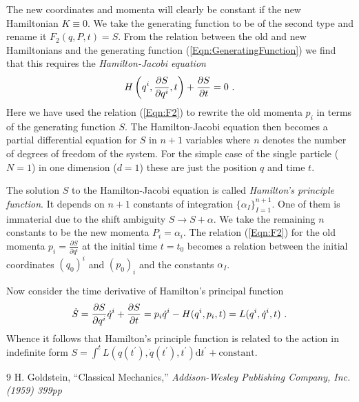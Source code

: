 \documentclass[12pt]{article}
\begin{document}
The new coordinates and momenta will clearly be constant if the new Hamiltonian $K\equiv 0$. We take the generating function to be of the second type and rename it $F_2(q,P,t)=S$. From the relation between the old and new Hamiltonians and the generating function (\ref{Eqn:GeneratingFunction}) we find that this requires the {\em Hamilton-Jacobi equation}
\begin{eqnarray}
H\left(q^i, {\partial S\over \partial q^i}, t\right)+{\partial S\over \partial t}=0~.
\end{eqnarray}
Here we have used the relation (\ref{Eqn:F2}) to rewrite the old momenta $p_i$ in terms of the generating function $S$. The Hamilton-Jacobi equation then becomes a partial differential equation for $S$ in $n+1$ variables where $n$ denotes the number of degrees of freedom of the system. For the simple case of the single particle ($N=1$) in one dimension ($d=1$) these are just the position $q$ and time $t$. 

The solution $S$ to the Hamilton-Jacobi equation is called {\em Hamilton's principle function}. It depends on $n+1$ constants of integration $\{\alpha_I\}_{I=1}^{n+1}$. One of them is immaterial due to the shift ambiguity $S\to S+\alpha$. We take the remaining $n$ constants to be the new momenta $P_i=\alpha_i$. The relation (\ref{Eqn:F2}) for the old momenta $p_i=\frac{\partial S}{\partial q^i}$ at the initial time $t=t_0$ becomes a relation between the initial coordinates%
$(q_0)^i$ and $(p_0)_i$ and the constants $\alpha_I$. 

Now consider the time derivative of Hamilton's principal function
\begin{eqnarray}
\dot S={\partial S\over \partial q^i}\dot q^i+{\partial S\over \partial t}=p_i \dot q^i-H(q^i, p_i, t)=L(q^i, \dot q^i, t)~.
\end{eqnarray}
Whence it follows that Hamilton's principle function is related to the action in indefinite form $S=\int^t L(q(t^\prime), \dot q(t^\prime), t^\prime)\mathrm d t^\prime+\mathrm {constant}.$


\begin{thebibliography}{9}
 H. Goldstein, ``Classical Mechanics,'' {\it Addison-Wesley Publishing Company, Inc. (1959) 399pp}
\end{thebibliography}
\end{document}
